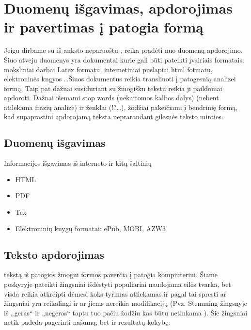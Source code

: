 \documentclass{VUMIFInfKursinis}
\begin{document}
\section{Duomenų išgavimas, apdorojimas ir pavertimas į patogia formą}
		Jeigu dirbame su iš anksto neparuoštu , reika pradėti nuo duomenų apdorojimo\cite{kadhim2014text}. Šiuo atveju duomenys yra dokumentai kurie gali būti pateikti įvairiais formatais: moksliniai darbai Latex formatu, internetiniai puslapiai html fotmatu, elektroninės kngyos \ldots Šiuos dokumentus reikia transliuoti į patogesnią analizei formą. Taip pat dažnai susiduriant su žmogišku tekstu reikia ji paildomai apdoroti. Dažnai išemami stop words (nekaitomos kalbos dalys) (nebent atilekama frazių analizė) ir ženklai (!?\ldots), žodžiai pakeičiami į bendrinię formą, kad supaprastini apdorojamą teksta neprarandant gilesnės teksto minties. 

	\subsection{Duomenų išgavimas}
		Informacijos išgavimas iš interneto ir kitų šaltinių
		\begin{itemize}
			\item HTML
			\item PDF
			\item Tex
			\item Elektroninių knygų formatai: ePub, MOBI, AZW3
		\end{itemize}

	\subsection{Teksto apdorojimas}
		 tekstą iš patogios žmogui formos paverčia į patogia kompiuteriui. Šiame poskyryje pateikti žingsniai išdėstyti populiariai naudojama eilės tvarka, bet visda reikia atkreipti dėmesi koks tyrimas atliekamas ir pagal tai spresti ar žingsniai yra reikalingi ir ar jiems nereikia modifikacijų (Pvz. Stemming žingsnyje iš „geras“ ir „negeras“ taptu tuo pačiu žodžiu kas būtu netinkama ). Šie žingsniai netik padeda pagerinti našumą, bet ir rezultatų kokybę\cite{mugunthadevi2011survey}.
\end{document}
